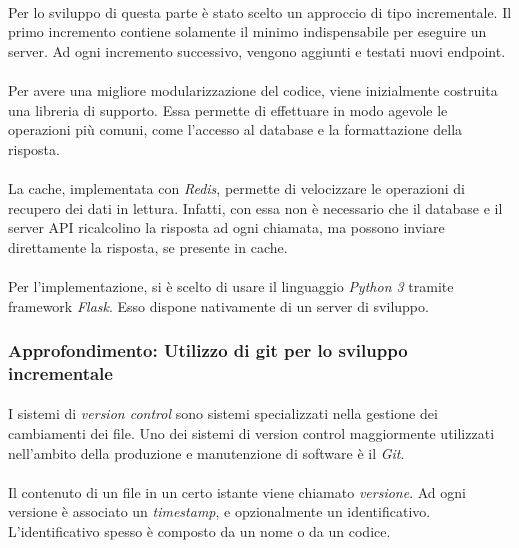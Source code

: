 \documentclass[11pt,a4paper,english]{article}
\begin{document}
\paragraph{} Per lo sviluppo di questa parte è stato scelto un approccio di tipo incrementale. Il primo incremento contiene solamente il minimo indispensabile per eseguire un server. Ad ogni incremento successivo, vengono aggiunti e testati nuovi endpoint.

\paragraph{} Per avere una migliore modularizzazione del codice, viene inizialmente costruita una libreria di supporto. Essa permette di effettuare in modo agevole le operazioni più comuni, come l'accesso al database e la formattazione della risposta. 

\paragraph{} La cache, implementata con \emph{Redis}, permette di velocizzare le operazioni di recupero dei dati in lettura. Infatti, con essa non è necessario che il database e il server API ricalcolino la risposta ad ogni chiamata, ma possono inviare direttamente la risposta, se presente in cache.

\paragraph{} Per l'implementazione, si è scelto di usare il linguaggio \emph{Python 3} tramite framework \emph{Flask}. Esso dispone nativamente di un server di sviluppo.  

\subsubsection{Approfondimento: Utilizzo di git per lo sviluppo incrementale}

\paragraph{} I sistemi di \emph{version control} sono sistemi specializzati nella gestione dei cambiamenti dei file. Uno dei sistemi di version control maggiormente utilizzati nell'ambito della produzione e manutenzione di software è il \emph{Git}.

\paragraph{} Il contenuto di un file in un certo istante viene chiamato \emph{versione}. Ad ogni versione è associato un \emph{timestamp}, e opzionalmente un identificativo. L'identificativo spesso è composto da un nome o da un codice. 
\end{document}
